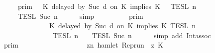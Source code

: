 \begin{isabellebody}
\ \ \ \ \ \ {\isacharequal}\ {\isasymlbrakk}{\isasymlbrakk}\ {\isasymGamma}\ {\isasymrbrakk}{\isasymrbrakk}\isactrlsub p\isactrlsub r\isactrlsub i\isactrlsub m\ {\isasyminter}\ {\isasymlbrakk}{\isasymlbrakk}\ {\isacharparenleft}K\ delayed\ by\ {\isacharparenleft}Suc\ d{\isacharparenright}\ on\ K\ implies\ K\ {\isacharhash}\ {\isasymPsi}\ {\isasymrbrakk}{\isasymrbrakk}\isactrlsub T\isactrlsub E\isactrlsub S\isactrlsub L\isactrlbsup {\isasymge}\ n\isactrlesup \isanewline
\ \ \ \ \ \ {\isasyminter}\ {\isasymlbrakk}{\isasymlbrakk}\ {\isasymPhi}\ {\isasymrbrakk}{\isasymrbrakk}\isactrlsub T\isactrlsub E\isactrlsub S\isactrlsub L\isactrlbsup {\isasymge}\ Suc\ n\isactrlesup {\isacartoucheclose}\isanewline
\ \ \ \ \isamarkupfalse%
\ simp\isanewline
\ \ \isamarkupfalse%
\ \isamarkupfalse%
\ {\isacartoucheopen}{\isachardot}{\isachardot}{\isachardot}\ {\isacharequal}\ {\isasymlbrakk}{\isasymlbrakk}\ {\isasymGamma}\ {\isasymrbrakk}{\isasymrbrakk}\isactrlsub p\isactrlsub r\isactrlsub i\isactrlsub m\ \isanewline
\ \ \ \ \ \ \ \ \ \ \ \ \ \ \ \ {\isasyminter}\ {\isasymlbrakk}\ K\ delayed\ by\ {\isacharparenleft}Suc\ d{\isacharparenright}\ on\ K\ implies\ K\ {\isasymrbrakk}\isactrlsub T\isactrlsub E\isactrlsub S\isactrlsub L\isactrlbsup {\isasymge}\ n\isactrlesup \isanewline
\ \ \ \ \ \ \ \ \ \ \ \ \ \ \ \ {\isasyminter}\ {\isasymlbrakk}{\isasymlbrakk}\ {\isasymPsi}\ {\isasymrbrakk}{\isasymrbrakk}\isactrlsub T\isactrlsub E\isactrlsub S\isactrlsub L\isactrlbsup {\isasymge}\ n\isactrlesup \ {\isasyminter}\ {\isasymlbrakk}{\isasymlbrakk}\ {\isasymPhi}\ {\isasymrbrakk}{\isasymrbrakk}\isactrlsub T\isactrlsub E\isactrlsub S\isactrlsub L\isactrlbsup {\isasymge}\ Suc\ n\isactrlesup {\isacartoucheclose}\isanewline
\ \ \ \ \isamarkupfalse%
\ {\isacharparenleft}simp\ add{\isacharcolon}\ Int{\isacharunderscore}assoc{\isacharparenright}\isanewline
\ \ \isamarkupfalse%
\ \isamarkupfalse%
\ {\isacartoucheopen}{\isachardot}{\isachardot}{\isachardot}\ {\isacharequal}\ {\isasymlbrakk}{\isasymlbrakk}\ {\isasymGamma}\ {\isasymrbrakk}{\isasymrbrakk}\isactrlsub p\isactrlsub r\isactrlsub i\isactrlsub m\ \isanewline
\ \ \ \ \ \ \ \ \ \ \ \ \ \ \ \ {\isasyminter}\ {\isacharbraceleft}{\isasymrho}{\isachardot}\ {\isasymforall}z{\isasymge}n{\isachardot}\ hamlet\ {\isacharparenleft}{\isacharparenleft}Rep{\isacharunderscore}run\ {\isasymrho}{\isacharparenright}\ z\ K\ {\isasymlongrightarrow}\isanewline

\end{isabellebody}

